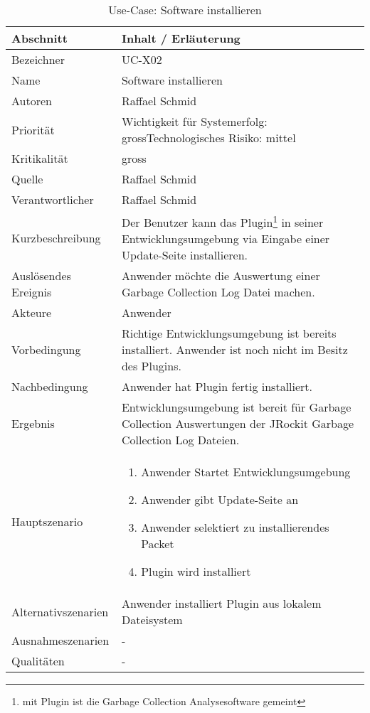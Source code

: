 \begin{longtable}{|p{4cm}|p{10.5cm}|}
  \caption{Use-Case: Software installieren}\\\hline
   \textbf{Abschnitt} & \textbf{Inhalt / Erläuterung} \\\hline
   Bezeichner & UC-X02\\\hline
   Name & Software installieren\\\hline
   Autoren & Raffael Schmid\\\hline
   Priorität & Wichtigkeit für Systemerfolg: gross\newline Technologisches Risiko: mittel\\\hline
   Kritikalität & gross\\\hline
   Quelle & Raffael Schmid\\\hline
   Verantwortlicher & Raffael Schmid\\\hline
   Kurzbeschreibung & Der Benutzer kann das Plugin\footnote{mit Plugin ist die Garbage Collection Analysesoftware gemeint} in seiner Entwicklungsumgebung via Eingabe einer Update-Seite installieren.\\\hline
   Auslösendes Ereignis & Anwender möchte die Auswertung einer Garbage Collection Log Datei machen.\\\hline
   Akteure & Anwender\\\hline
   Vorbedingung & Richtige Entwicklungsumgebung ist bereits installiert. Anwender ist noch nicht im Besitz des Plugins.\\\hline
   Nachbedingung & Anwender hat Plugin fertig installiert.\\\hline
   Ergebnis & Entwicklungsumgebung ist bereit für Garbage Collection Auswertungen der JRockit Garbage Collection Log Dateien.\\\hline
   Hauptszenario & 
         \begin{enumerate}
		\item Anwender Startet Entwicklungsumgebung
		\item Anwender gibt Update-Seite an
		\item Anwender selektiert zu installierendes Packet
		\item Plugin wird installiert	
 	\end{enumerate}
	\\\hline
   Alternativszenarien & Anwender installiert Plugin aus lokalem Dateisystem\\\hline
   Ausnahmeszenarien & -\\\hline
   Qualitäten & -\\\hline
\end{longtable}

